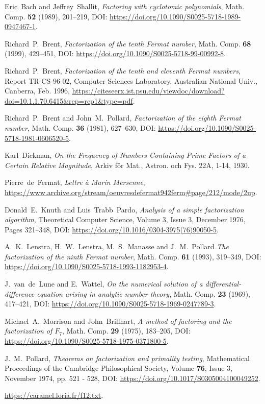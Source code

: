 \documentclass[a4paper, 11pt, pdftex]{report}
\theoremstyle{plain}
\theoremstyle{definition}
\begin{document}
\begin{thebibliography}{99}

 Eric~Bach and Jeffrey~Shallit, \emph{Factoring with cyclotomic polynomials},
Math. Comp. \textbf{52} (1989), 201--219, DOI: \url{https://doi.org/10.1090/S0025-5718-1989-0947467-1}.

 Richard~P.~Brent, \emph{Factorization of the tenth Fermat number}, Math. Comp.
\textbf{68} (1999), 429--451, DOI: \url{https://doi.org/10.1090/S0025-5718-99-00992-8}.

 Richard~P.~Brent, \emph{Factorization of the tenth and eleventh Fermat numbers},
Report TR-CS-96-02, Computer Sciences Laboratory, Australian National Univ., Canberra, Feb. 1996,
\url{https://citeseerx.ist.psu.edu/viewdoc/download?doi=10.1.1.70.6415&rep=rep1&type=pdf}.

 Richard~P.~Brent and John~M.~Pollard, \emph{Factorization of the eighth
Fermat number}, Math. Comp. \textbf{36} (1981), 627--630, DOI:
\url{https://doi.org/10.1090/S0025-5718-1981-0606520-5}.

 Karl~Dickman, \emph{On the Frequency of Numbers Containing Prime Factors
of a Certain Relative Magnitude}, Arkiv för Mat., Astron. och Fys. 22A, 1-14, 1930. 

 Pierre~de~Fermat, \emph{Lettre à Marin Mersenne},
\url{https://www.archive.org/stream/oeuvresdefermat942ferm#page/212/mode/2up}.

 Donald~E.~Knuth and Luis~Trabb~Pardo, \emph{Analysis of a simple
factorization algorithm}, Theoretical Computer Science, Volume 3, Issue 3, December 1976,
Pages 321--348, DOI: \url{https://doi.org/10.1016/0304-3975(76)90050-5}.

 A.~K.~Lenstra, H.~W.~Lenstra, M.~S.~Manasse and J.~M.~Pollard
\emph{The factorization of the ninth Fermat number}, Math. Comp. \textbf{61} (1993), 319--349,
DOI: \url{https://doi.org/10.1090/S0025-5718-1993-1182953-4}.

 J.~van~de~Lune and E.~Wattel, \emph{On the numerical solution of a
differential-difference equation arising in analytic number theory}, Math. Comp. \textbf{23}
(1969), 417--421, DOI: \url{https://doi.org/10.1090/S0025-5718-1969-0247789-3}.

 Michael~A.~Morrison and John~Brillhart, \emph{A method of factoring
and the factorization of $F_7$}, Math. Comp. \textbf{29} (1975), 183--205,
DOI: \url{https://doi.org/10.1090/S0025-5718-1975-0371800-5}.

 J.~M.~Pollard, \emph{Theorems on factorization and  primality testing},
Mathematical Proceedings of the Cambridge Philosophical Society, Volume \textbf{76}, Issue 3,
November 1974, pp. 521 - 528, DOI: \url{https://doi.org/10.1017/S0305004100049252}.

 \url{https://caramel.loria.fr/f12.txt}.

\end{thebibliography}
\end{document}
